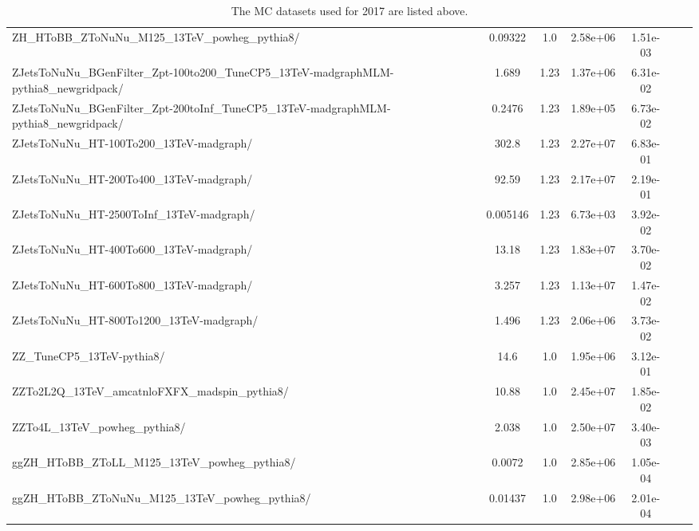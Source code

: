 \begin{table}
\begin{center}
{\begin{tabular}{|l|c|c|c|c|c|c|}
ZH\_HToBB\_ZToNuNu\_M125\_13TeV\_powheg\_pythia8/ & 0.09322 & 1.0 & 2.58e+06 & 1.51e-03 \\
ZJetsToNuNu\_BGenFilter\_Zpt-100to200\_TuneCP5\_13TeV-madgraphMLM-pythia8\_newgridpack/ & 1.689 & 1.23 & 1.37e+06 & 6.31e-02 \\
ZJetsToNuNu\_BGenFilter\_Zpt-200toInf\_TuneCP5\_13TeV-madgraphMLM-pythia8\_newgridpack/ & 0.2476 & 1.23 & 1.89e+05 & 6.73e-02 \\
ZJetsToNuNu\_HT-100To200\_13TeV-madgraph/ & 302.8 & 1.23 & 2.27e+07 & {\color{orange}6.83e-01} \\
ZJetsToNuNu\_HT-200To400\_13TeV-madgraph/ & 92.59 & 1.23 & 2.17e+07 & 2.19e-01 \\
ZJetsToNuNu\_HT-2500ToInf\_13TeV-madgraph/ & 0.005146 & 1.23 & 6.73e+03 & 3.92e-02 \\
ZJetsToNuNu\_HT-400To600\_13TeV-madgraph/ & 13.18 & 1.23 & 1.83e+07 & 3.70e-02 \\
ZJetsToNuNu\_HT-600To800\_13TeV-madgraph/ & 3.257 & 1.23 & 1.13e+07 & 1.47e-02 \\
ZJetsToNuNu\_HT-800To1200\_13TeV-madgraph/ & 1.496 & 1.23 & 2.06e+06 & 3.73e-02 \\
ZZ\_TuneCP5\_13TeV-pythia8/ & 14.6 & 1.0 & 1.95e+06 & {\color{orange}3.12e-01} \\
ZZTo2L2Q\_13TeV\_amcatnloFXFX\_madspin\_pythia8/ & 10.88 & 1.0 & 2.45e+07 & 1.85e-02 \\
ZZTo4L\_13TeV\_powheg\_pythia8/ & 2.038 & 1.0 & 2.50e+07 & 3.40e-03 \\
ggZH\_HToBB\_ZToLL\_M125\_13TeV\_powheg\_pythia8/ & 0.0072 & 1.0 & 2.85e+06 & 1.05e-04 \\
ggZH\_HToBB\_ZToNuNu\_M125\_13TeV\_powheg\_pythia8/ & 0.01437 & 1.0 & 2.98e+06 & 2.01e-04 \\
 
\hline 
\end{tabular}} 
\end{center} 
\caption[2017 MC samples]{ 
  The MC datasets used for 2017 are listed above.
}
\label{tab:mc_2017} 
\end{table}


